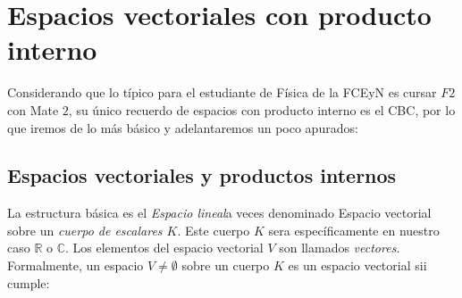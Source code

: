 \documentclass[a4paper,spanish]{article}
\def\C {\mathbb{C}}
\def\R {\mathbb{R}}
\numberwithin{equation}{section}
\begin{document}
\section{Espacios vectoriales con producto interno}
Considerando que lo t\'ipico para el estudiante de F\'isica de la FCEyN es cursar $F2$ con Mate $2$, su \'unico recuerdo de espacios con producto interno es el CBC, por lo que iremos de lo m\'as b\'asico y adelantaremos un poco apurados:
\\
\subsection{Espacios vectoriales y productos internos}
La estructura b\'asica es el \textit{Espacio lineal}a veces denominado Espacio vectorial sobre un \textit{cuerpo de escalares $K$}. Este cuerpo $K$ sera espec\'ificamente en nuestro caso $\R$ o $\C$. Los elementos del espacio vectorial $V$ son llamados \textit{vectores}. Formalmente, un espacio $V \neq \emptyset$ sobre un cuerpo $K$ es un espacio vectorial sii cumple:
\end{document}
